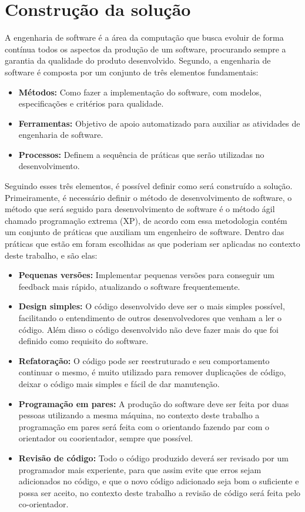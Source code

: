 \section{Construção da solução}
\label{section:construcao}

A engenharia de software é a área da computação que busca evoluir de forma contínua
todos os aspectos da produção de um software, procurando sempre a garantia da
qualidade do produto desenvolvido. Segundo\cite{pressman2011engenharia}, a engenharia
de software é composta por um conjunto de três elementos fundamentais:

\begin{itemize}
  \item \textbf{Métodos:} Como fazer a implementação do software, com modelos,
  especificações e critérios para qualidade.
  \item \textbf{Ferramentas:} Objetivo de apoio automatizado para auxiliar as atividades
  de engenharia de software.
  \item \textbf{Processos:} Definem a sequência de práticas que serão utilizadas no
  desenvolvimento.
\end{itemize}

Seguindo esses três elementos, é possível definir como será construído a solução.
Primeiramente, é necessário definir o método de desenvolvimento de software, o
método que será seguido para desenvolvimento de software é o método ágil chamado
programação extrema (XP), de acordo com\cite{796139} essa metodologia contém um
conjunto de práticas que auxiliam um engenheiro de software. Dentro das práticas
que estão em\cite{796139} foram escolhidas as que poderiam ser aplicadas no
contexto deste trabalho, e são elas:

\begin{itemize}
  \item \textbf{Pequenas versões:} Implementar pequenas versões para conseguir
  um feedback mais rápido, atualizando o software frequentemente.
  \item \textbf{Design simples:} O código desenvolvido deve ser o mais simples possível,
  facilitando o entendimento de outros desenvolvedores que venham a ler o código.
  Além disso o código desenvolvido não deve fazer mais do que foi definido como
  requisito do software.
  \item \textbf{Refatoração:} O código pode ser reestruturado e seu comportamento
  continuar o mesmo, é muito utilizado para remover duplicações de código, deixar
  o código mais simples e fácil de dar manutenção.
  \item \textbf{Programação em pares:} A produção do software deve ser feita por duas
  pessoas utilizando a mesma máquina, no contexto deste trabalho a programação
  em pares será feita com o orientando fazendo par com o orientador ou coorientador,
  sempre que possível.
  \item \textbf{Revisão de código:} Todo o código produzido deverá ser revisado
  por um programador mais experiente, para que assim evite que erros sejam
  adicionados no código, e que o novo código adicionado seja bom o suficiente
  e possa ser aceito, no contexto deste trabalho a revisão de código será
  feita pelo co-orientador.
\end{itemize}

